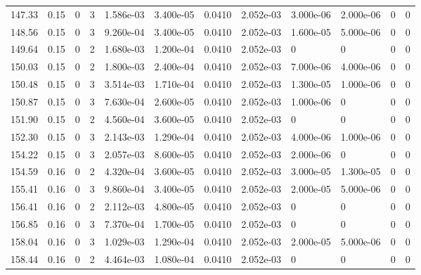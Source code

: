 \documentclass[preview]{standalone}
\begin{document}
{{{{{{{\begin{tabular}{L{1.2cm}C{1.2cm} C{0.3cm}C{0.5cm} C{1.4cm}C{1.4cm} C{1.4cm}C{1.4cm} C{1.6cm}C{1.6cm} C{1.6cm}C{1.6cm}}
  147.33  &  0.15  & 0     &  3 &  1.586e-03  & 3.400e-05  &  0.0410&   2.052e-03& 3.000e-06 & 2.000e-06   &  0 & 0  \\ 
  148.56  &  0.15  & 0     &  3 &  9.260e-04  & 3.400e-05  &  0.0410&   2.052e-03& 1.600e-05 & 5.000e-06   &  0 & 0  \\ 
  149.64  &  0.15  & 0     &  2 &  1.680e-03  & 1.200e-04  &  0.0410&   2.052e-03& 0 & 0   &  0 & 0  \\ 
  150.03  &  0.15  & 0     &  2 &  1.800e-03  & 2.400e-04  &  0.0410&   2.052e-03& 7.000e-06 & 4.000e-06   &  0 & 0  \\ 
  150.48  &  0.15  & 0     &  3 &  3.514e-03  & 1.710e-04  &  0.0410&   2.052e-03& 1.300e-05 & 1.000e-06   &  0 & 0  \\ 
  150.87  &  0.15  & 0     &  3 &  7.630e-04  & 2.600e-05  &  0.0410&   2.052e-03& 1.000e-06 & 0   &  0 & 0  \\ 
  151.90  &  0.15  & 0     &  2 &  4.560e-04  & 3.600e-05  &  0.0410&   2.052e-03& 0 & 0   &  0 & 0  \\ 
  152.30  &  0.15  & 0     &  3 &  2.143e-03  & 1.290e-04  &  0.0410&   2.052e-03& 4.000e-06 & 1.000e-06   &  0 & 0  \\ 
  154.22  &  0.15  & 0     &  3 &  2.057e-03  & 8.600e-05  &  0.0410&   2.052e-03& 2.000e-06 & 0   &  0 & 0  \\ 
  154.59  &  0.16  & 0     &  2 &  4.320e-04  & 3.600e-05  &  0.0410&   2.052e-03& 3.000e-05 & 1.300e-05   &  0 & 0  \\ 
  155.41  &  0.16  & 0     &  3 &  9.860e-04  & 3.400e-05  &  0.0410&   2.052e-03& 2.000e-05 & 5.000e-06   &  0 & 0  \\ 
  156.41  &  0.16  & 0     &  2 &  2.112e-03  & 4.800e-05  &  0.0410&   2.052e-03& 0 & 0   &  0 & 0  \\ 
  156.85  &  0.16  & 0     &  3 &  7.370e-04  & 1.700e-05  &  0.0410&   2.052e-03& 0 & 0   &  0 & 0  \\ 
  158.04  &  0.16  & 0     &  3 &  1.029e-03  & 1.290e-04  &  0.0410&   2.052e-03& 2.000e-05 & 5.000e-06   &  0 & 0  \\ 
  158.44  &  0.16  & 0     &  2 &  4.464e-03  & 1.080e-04  &  0.0410&   2.052e-03& 0 & 0   &  0 & 0  \\ 
\hline 
\end{tabular} 

}}}}}}}
\end{document}
